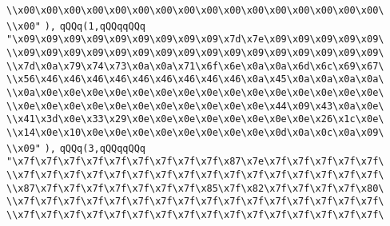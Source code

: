 \verb|\\x00\x00\x00\x00\x00\x00\x00\x00\x00\x00\x00\x00\x00\x00\x00\x00\|\newline
\verb|\\x00"|\newline
\verb|),|\newline
\verb|qQQq(1,qQQqqQQq|\newline
\verb|"\x09\x09\x09\x09\x09\x09\x09\x09\x09\x7d\x7e\x09\x09\x09\x09\x09\|\newline
\verb|\\x09\x09\x09\x09\x09\x09\x09\x09\x09\x09\x09\x09\x09\x09\x09\x09\|\newline
\verb|\\x7d\x0a\x79\x74\x73\x0a\x0a\x71\x6f\x6e\x0a\x0a\x6d\x6c\x69\x67\|\newline
\verb|\\x56\x46\x46\x46\x46\x46\x46\x46\x46\x46\x0a\x45\x0a\x0a\x0a\x0a\|\newline
\verb|\\x0a\x0e\x0e\x0e\x0e\x0e\x0e\x0e\x0e\x0e\x0e\x0e\x0e\x0e\x0e\x0e\|\newline
\verb|\\x0e\x0e\x0e\x0e\x0e\x0e\x0e\x0e\x0e\x0e\x0e\x44\x09\x43\x0a\x0e\|\newline
\verb|\\x41\x3d\x0e\x33\x29\x0e\x0e\x0e\x0e\x0e\x0e\x0e\x0e\x26\x1c\x0e\|\newline
\verb|\\x14\x0e\x10\x0e\x0e\x0e\x0e\x0e\x0e\x0e\x0e\x0d\x0a\x0c\x0a\x09\|\newline
\verb|\\x09"|\newline
\verb|),|\newline
\verb|qQQq(3,qQQqqQQq|\newline
\verb|"\x7f\x7f\x7f\x7f\x7f\x7f\x7f\x7f\x7f\x87\x7e\x7f\x7f\x7f\x7f\x7f\|\newline
\verb|\\x7f\x7f\x7f\x7f\x7f\x7f\x7f\x7f\x7f\x7f\x7f\x7f\x7f\x7f\x7f\x7f\|\newline
\verb|\\x87\x7f\x7f\x7f\x7f\x7f\x7f\x7f\x85\x7f\x82\x7f\x7f\x7f\x7f\x80\|\newline
\verb|\\x7f\x7f\x7f\x7f\x7f\x7f\x7f\x7f\x7f\x7f\x7f\x7f\x7f\x7f\x7f\x7f\|\newline
\verb|\\x7f\x7f\x7f\x7f\x7f\x7f\x7f\x7f\x7f\x7f\x7f\x7f\x7f\x7f\x7f\x7f\|\newline
